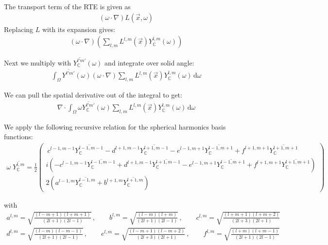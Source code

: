 \documentclass{egpubl}
\newcommand{\ud}{\,\mathrm{d}} %
\newcommand{\SHBC}{Y_{\mathbb{C}}} %
\begin{document}
The transport term of the RTE is given as
\begin{align*}
(\omega\cdot\nabla)L(\vec{x}, \omega)
\end{align*}
Replacing $L$ with its expansion gives:
\begin{align*}
\left(\omega\cdot\nabla\right)
\left(
\sum_{l,m}
{
L^{l,m}\left(\vec{x}\right )
\SHBC^{l,m}\left(\omega\right)
}
\right)
\end{align*}

Next we multiply with $\overline{\SHBC^{l'm'}}(\omega)$ and integrate over solid angle:
\begin{align*}
\int_\Omega
{
\overline{Y^{l'm'}}(\omega)(\omega\cdot\nabla)
\sum_{l,m}
{
L^{l,m}\left(\vec{x}\right)
\SHBC^{l,m}\left(\omega\right)
}
}
\ud\omega
\end{align*}

We can pull the spatial derivative out of the integral to get:
\begin{align}
\nabla\cdot\int_\Omega
{
\omega\overline{\SHBC^{l'm'}}(\omega)
\sum_{l,m}
{
L^{l,m}\left(\vec{x}\right)
\SHBC^{l,m}\left(\omega\right)
}
\ud\omega
}
\label{eq:complex_transport_a}
\end{align}


We apply the following recursive relation for the spherical harmonics basis functions:
\begin{align}
\omega\;\overline{\SHBC^{l,m}} = \frac{1}{2}
\begin{pmatrix}
\ c^{l-1, m-1}\overline{\SHBC^{l-1,m-1}} - d^{l+1, m-1}\overline{\SHBC^{l+1,m-1}} - e^{l-1, m+1}\overline{\SHBC^{l-1,m+1}} + f^{l+1, m+1}\overline{\SHBC^{l+1,m+1}}\\
i\left(-c^{l-1, m-1}\overline{\SHBC^{l-1,m-1}} + d^{l+1, m-1}\overline{\SHBC^{l+1,m-1}} - e^{l-1, m+1}\overline{\SHBC^{l-1,m+1}} + f^{l+1, m+1}\overline{\SHBC^{l+1,m+1}}\right) \\
2\left(a^{l-1, m}\overline{\SHBC^{l-1,m}}+b^{l+1, m}\overline{\SHBC^{l+1,m}}\right)
\end{pmatrix}
\label{eq:recursive_relation}
\end{align}

with
\begin{align*}
a^{l,m}= \sqrt{\frac{\left(l-m+1\right)\left(l+m+1\right)}{\left(2l+1\right)\left(2l-1\right)}} \, , \qquad
b^{l,m}= \sqrt{\frac{\left(l-m\right)\left(l+m\right)}{\left(2l+1\right)\left(2l-1\right)}} \, , \qquad
c^{l,m}= \sqrt{\frac{\left(l+m+1\right)\left(l+m+2\right)}{\left(2l+3\right)\left(2l+1\right)}}\\
d^{l,m}= \sqrt{\frac{\left(l-m\right)\left(l-m-1\right)}{\left(2l+1\right)\left(2l-1\right)}} \, , \qquad
e^{l,m}= \sqrt{\frac{\left(l-m+1\right)\left(l-m+2\right)}{\left(2l+3\right)\left(2l+1\right)}} \, , \qquad
f^{l,m}= \sqrt{\frac{\left(l+m\right)\left(l+m-1\right)}{\left(2l+1\right)\left(2l-1\right)}}
\end{align*}
\end{document}
